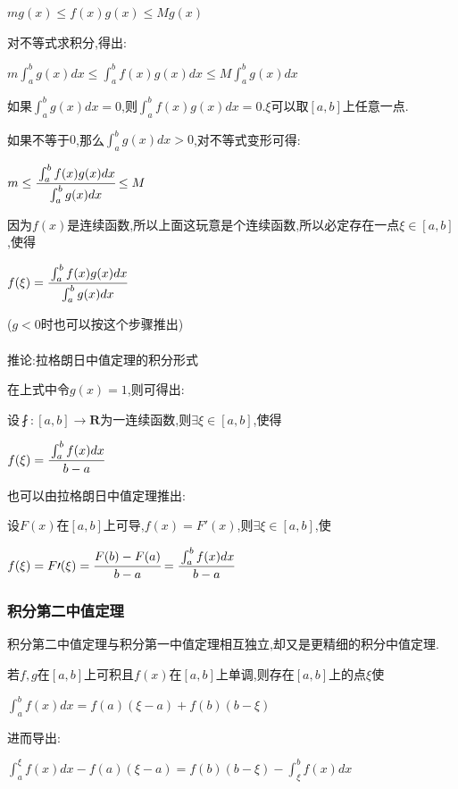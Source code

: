 \documentclass[UTF8,12pt]{ctexbook}
\newcommand{\defFunction}[1]{f(#1)}
\newcommand{\definiteIntegral}[2]{\int^{#1}_{#2}}
\begin{document}
{{{{$mg(x) \leq \defFunction{x}g(x) \leq Mg(x)$

对不等式求积分,得出:

$m\definiteIntegral{b}{a}g(x)dx \leq \definiteIntegral{b}{a}\defFunction{x}g(x)dx \leq M\definiteIntegral{b}{a}g(x)dx$

如果$\definiteIntegral{b}{a}g(x)dx = 0$,则$\definiteIntegral{b}{a}\defFunction{x}g(x)dx = 0$.$\xi$可以取$[a,b]$上任意一点.

如果不等于$0$,那么$\definiteIntegral{b}{a}g(x)dx>0$,对不等式变形可得:

$m \leq \cfrac{\definiteIntegral{b}{a}\defFunction{x}g(x)dx}{\definiteIntegral{b}{a}g(x)dx} \leq M$

因为$f(x)$是连续函数,所以上面这玩意是个连续函数,所以必定存在一点$\xi\in[a,b]$,使得

$\defFunction{\xi} = \cfrac{\definiteIntegral{b}{a}\defFunction{x}g(x)dx}{\definiteIntegral{b}{a}g(x)dx}$

($g<0$时也可以按这个步骤推出)
\\\\
推论:拉格朗日中值定理的积分形式

在上式中令$g(x) = 1$,则可得出:

设$\fint : [a,b] \to \mathbf{R}$为一连续函数,则$\exists\xi\in[a,b]$,使得

$\defFunction{\xi} = \cfrac{\definiteIntegral{b}{a}\defFunction{x}dx}{b - a}$

也可以由拉格朗日中值定理推出:

设$F(x)$在$[a,b]$上可导,$\defFunction{x} = F\prime(x)$,则$\exists\xi\in[a,b]$,使

$\defFunction{\xi} = F\prime(\xi) = \cfrac{F(b) - F(a)}{b - a} = \cfrac{\definiteIntegral{b}{a}\defFunction{x}dx}{b - a}$

}%

\subsubsection{积分第二中值定理}{

积分第二中值定理与积分第一中值定理相互独立,却又是更精细的积分中值定理.

若$f,g$在$[a,b]$上可积且$f(x)$在$[a,b]$上单调,则存在$[a,b]$上的点$\xi$使

$\definiteIntegral{b}{a}\defFunction{x}dx = \defFunction{a}(\xi - a) + \defFunction{b}(b - \xi)$

进而导出:

$\definiteIntegral{\xi}{a}\defFunction{x}dx -\defFunction{a}(\xi - a) = \defFunction{b}(b - \xi) - \definiteIntegral{b}{\xi}\defFunction{x}dx$

}}}}
\end{document}
